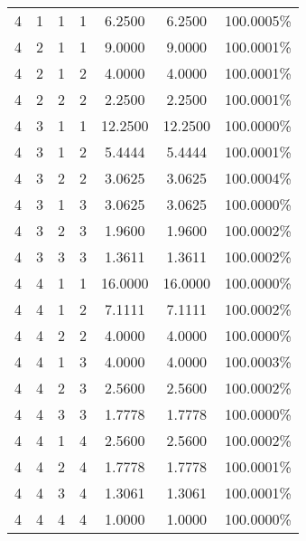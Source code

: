 \documentclass[11pt,a4paper]{article}
\numberwithin{equation}{section}
\begin{document}
\begin{appendices}
\begin{center}
\begin{tabular}{cccc|cc|c}
			4 & 1 & 1 & 1 & 6.2500 & 6.2500 & 100.0005\% \\
			4 & 2 & 1 & 1 & 9.0000 & 9.0000 & 100.0001\% \\
			4 & 2 & 1 & 2 & 4.0000 & 4.0000 & 100.0001\% \\
			4 & 2 & 2 & 2 & 2.2500 & 2.2500 & 100.0001\% \\
			4 & 3 & 1 & 1 & 12.2500 & 12.2500 & 100.0000\% \\
			4 & 3 & 1 & 2 & 5.4444 & 5.4444 & 100.0001\% \\
			4 & 3 & 2 & 2 & 3.0625 & 3.0625 & 100.0004\% \\
			4 & 3 & 1 & 3 & 3.0625 & 3.0625 & 100.0000\% \\
			4 & 3 & 2 & 3 & 1.9600 & 1.9600 & 100.0002\% \\
			4 & 3 & 3 & 3 & 1.3611 & 1.3611 & 100.0002\% \\
			4 & 4 & 1 & 1 & 16.0000 & 16.0000 & 100.0000\% \\
			4 & 4 & 1 & 2 & 7.1111 & 7.1111 & 100.0002\% \\
			4 & 4 & 2 & 2 & 4.0000 & 4.0000 & 100.0000\% \\
			4 & 4 & 1 & 3 & 4.0000 & 4.0000 & 100.0003\% \\
			4 & 4 & 2 & 3 & 2.5600 & 2.5600 & 100.0002\% \\
			4 & 4 & 3 & 3 & 1.7778 & 1.7778 & 100.0000\% \\
			4 & 4 & 1 & 4 & 2.5600 & 2.5600 & 100.0002\% \\
			4 & 4 & 2 & 4 & 1.7778 & 1.7778 & 100.0001\% \\
			4 & 4 & 3 & 4 & 1.3061 & 1.3061 & 100.0001\% \\
			4 & 4 & 4 & 4 & 1.0000 & 1.0000 & 100.0000\% \\
			\hline
		\end{tabular}
	\end{center}
	
	\end{appendices}
		
	
	
	
	
\end{document}

